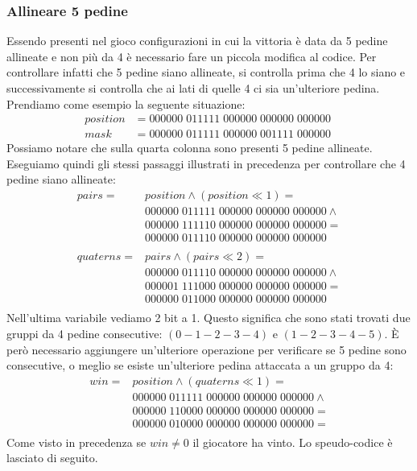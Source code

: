 \documentclass[a4paper]{article}
\begin{document}
\subsubsection{Allineare 5 pedine}
Essendo presenti nel gioco configurazioni in cui la vittoria è data da 5 pedine
allineate e non più da 4 è necessario fare un piccola modifica al codice. Per 
controllare infatti che 5 pedine siano allineate, si controlla prima che 4 lo 
siano e successivamente si controlla che ai lati di quelle 4 ci sia un'ulteriore
pedina. Prendiamo come esempio la seguente situazione:
\begin{align*}
  position &= 000000\; 011111\; 000000\; 000000\; 000000\\
  mask &= 000000\; 011111\; 000000\; 001111\; 000000\;
\end{align*}
Possiamo notare che sulla quarta colonna sono presenti 5 pedine allineate. 
Eseguiamo quindi gli stessi passaggi illustrati in precedenza per controllare 
che 4 pedine siano allineate:
\begin{align*}
  pairs = &position \land (position \ll 1) =\\
  &000000\; 011111\; 000000\; 000000\; 000000 \land \\
  &000000\; 111110\; 000000\; 000000\; 000000 = \\
  &000000\; 011110\; 000000\; 000000\; 000000\\
  \\
  quaterns = &pairs \land (pairs \ll 2) =\\
  &000000\; 011110\; 000000\; 000000\; 000000 \land \\
  &000001\; 111000\; 000000\; 000000\; 000000 = \\
  &000000\; 011000\; 000000\; 000000\; 000000\\
\end{align*}
Nell'ultima variabile vediamo 2 bit a 1. Questo significa che sono stati trovati
due gruppi da 4 pedine consecutive: $(0-1-2-3-4)$ e $(1-2-3-4-5)$. È però 
necessario aggiungere un'ulteriore operazione per verificare se 5 pedine sono
consecutive, o meglio se esiste un'ulteriore pedina attaccata a un gruppo da 4:
\begin{align*}
  win = &position \land (quaterns \ll 1) =\\
  &000000\; 011111\; 000000\; 000000\; 000000 \land \\
  &000000\; 110000\; 000000\; 000000\; 000000 = \\
  &000000\; 010000\; 000000\; 000000\; 000000 = \\
\end{align*}
Come visto in precedenza se $win \neq 0$ il giocatore ha vinto. Lo speudo-codice
è lasciato di seguito.
\end{document}
